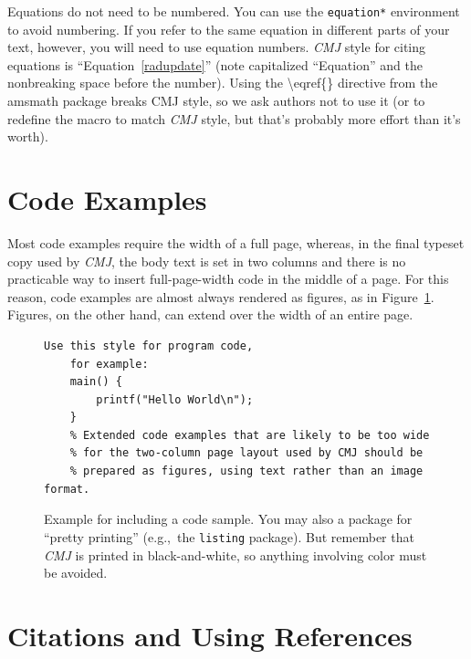 \documentclass[letterpaper, 12pt]{article}
\begin{document}
Equations do not need to be numbered.
You can use the {\tt equation*} environment to avoid numbering.
If you refer to the same equation in different parts of your text, however, you will need to use equation numbers.
\emph{CMJ} style for citing equations is ``Equation~\ref{radupdate}'' (note capitalized ``Equation'' and the nonbreaking space before the number). 
Using the \textbackslash eqref\{\} directive from the amsmath package breaks CMJ style, so we ask authors not to use it (or to redefine the macro to match \emph{CMJ} style, but that's probably more effort than it's worth).

\pagebreak[1]
\section{Code Examples}
Most code examples require the width of a full page, whereas, in the final typeset copy used by \emph{CMJ}, the body text is set in two columns and there is no practicable way to insert full-page-width code in the middle of a page. 
For this reason, code examples are almost always rendered as figures, as in Figure~\ref{fig:code}.
Figures, on the other hand, can extend over the width of an entire page. 

\begin{figure}
    \begin{Verbatim}[fontfamily=courier, xleftmargin=\parindent]
    Use this style for program code, 
    for example:
    main() {
        printf("Hello World\n");    
    }
    % Extended code examples that are likely to be too wide 
    % for the two-column page layout used by CMJ should be 
    % prepared as figures, using text rather than an image format. 
    \end{Verbatim}
    \caption{Example for including a code sample. 
	You may also a package for ``pretty printing'' (e.g.,~the \texttt{listing} package).
	But remember that \emph{CMJ} is printed in black-and-white, so anything involving color must be avoided.}
\label{fig:code}
\end{figure}

\section{Citations and Using References}
\end{document}
